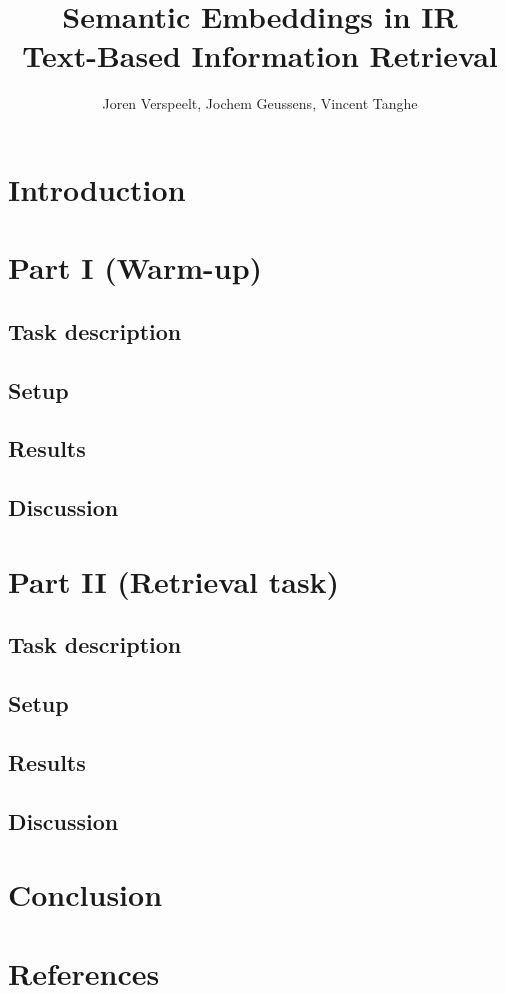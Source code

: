 \documentclass[11pt,a4paper]{extarticle}
\author{Joren Verspeelt, Jochem Geussens, Vincent Tanghe}
\title{Semantic Embeddings in IR \\
	\large Text-Based Information Retrieval}
\begin{document}
\maketitle

\section {Introduction}


\clearpage
\tableofcontents
\clearpage



\section {Part I (Warm-up)}
\subsection{Task description}


\subsection{Setup}


\subsection{Results}


\subsection{Discussion}




\section{Part II (Retrieval task)}
\subsection{Task description}


\subsection{Setup}


\subsection{Results}


\subsection{Discussion}



\section{Conclusion}


\section{References}


	
\end{document}
